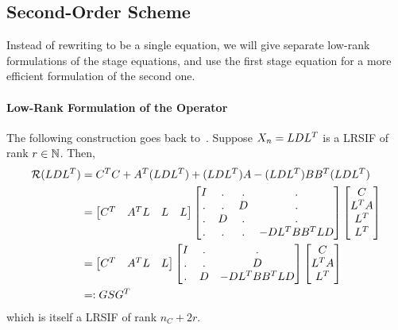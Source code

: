 \subsection{Second-Order Scheme}

Instead of rewriting  to be a single equation,
we will give separate low-rank formulations of the stage equations,
and use the first stage equation for a more efficient formulation of the second one.

\paragraph{Low-Rank Formulation of the \Riccati Operator}

The following construction goes back to~\cite{Lang2015}.
Suppose $X_n = LDL^T$ is a \ac{LRSIF} of rank $r\in\mathbb{N}$.
Then,
\begin{subequations}
\begin{align}
  \operatorname{\mathcal R}(LDL^T)
  &= C^T C + A^T (LDL^T) + (LDL^T) A - (LDL^T) BB^T (LDL^T) \\
  &= \begin{bmatrix}
    C^T & A^T L & L & L
  \end{bmatrix}
  \begin{bmatrix}
    I & . & . & . \\
    . & . & D & . \\
    . & D & . & . \\
    . & . & . & - DL^T BB^T LD
  \end{bmatrix}
  \begin{bmatrix}
    C \\
    L^T A \\
    L^T \\
    L^T
  \end{bmatrix} \\
  \label{eq:ros:lr-condensed:2}
  &= \begin{bmatrix}
    C^T & A^T L & L
  \end{bmatrix}
  \begin{bmatrix}
    I & . & . \\
    . & . & D \\
    . & D & - DL^T BB^T LD
  \end{bmatrix}
  \begin{bmatrix}
    C \\
    L^T A \\
    L^T
  \end{bmatrix} \\
  &=: GSG^T
\end{align}
\end{subequations}
which is itself a \ac{LRSIF} of rank $n_C + 2r$.

